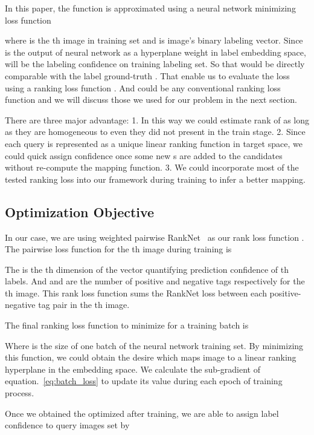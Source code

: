 \documentclass[10pt,twocolumn,letterpaper]{article}
\begin{document}
{In this paper, the function  is approximated using a neural network minimizing loss function
	
	


where  is the th image in training set and  is image's binary labeling vector. Since  is the output of neural network as a hyperplane weight in label embedding space,  will be the labeling confidence on training labeling set. So that  would be directly comparable with the label ground-truth . That enable us to evaluate the loss using a ranking loss function . And  could be any conventional ranking loss function and we will discuss those we used for our problem in the next section.

There are three major advantage: 1. In this way we could estimate rank of  as long as they are homogeneous to  even they did not present in the train stage. 2. Since each query is represented as a unique linear ranking function in target space, we could quick assign confidence once some new s are added to the candidates without re-compute the mapping function.  3. We could incorporate most of the tested ranking loss into our framework during training to infer a better mapping.

\subsection{Optimization Objective}
In our case, we are using weighted pairwise RankNet~\cite{burges_learning_2005} as our rank loss function . The pairwise loss function for the th image during training is 

	 
	
The  is the th dimension of the vector  quantifying prediction confidence of th labels. And  and  are the number of positive and negative tags respectively for the th image. This rank loss function sums the RankNet loss between each positive-negative tag pair in the th image.
	
The final ranking loss function to minimize for a training batch is

 

Where  is the size of one batch of the neural network training set. By minimizing this function, we could obtain the desire  which maps image to a linear ranking hyperplane in the embedding space. We calculate the sub-gradient of equation.~\ref{eq:batch_loss} to update its value during each epoch of training process.

Once we obtained the optimized  after training, we are able to assign label confidence to query images set  by

}
\end{document}
